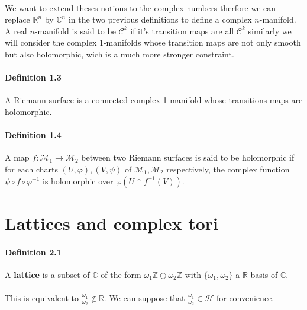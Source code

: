 \documentclass[letterpaper,10pt]{article}
\begin{document}
{\itshape \paragraph{} We want to extend theses notions to the complex numbers therfore we can replace $\mathbb{R}^n$ by $\mathbb{C}^n$ in the
 two previous definitions to define a complex $n$-manifold. A real $n$-manifold is said to be $\mathcal{C}^k$ if it's transition maps are all $\mathcal{C}^k$ 
 similarly we will consider the complex 1-manifolds whose transition maps are not only smooth but also holomorphic, wich is a much more stronger constraint.}

\paragraph{Definition 1.3} A Riemann surface is a connected complex 1-manifold whose transitions maps are holomorphic.

\paragraph{Definition 1.4} A map $f : \mathcal{M}_1 \to \mathcal{M}_2$ between two Riemann surfaces is said to be holomorphic if for each charts $(U,\varphi),(V,\psi)$
of $\mathcal{M}_1,\mathcal{M}_2$ respectively, the complex function $\psi \circ f \circ \varphi^{-1}$ is holomorphic over $\varphi(U\cap f^{-1}(V))$.





\section{Lattices and complex tori}%

\paragraph{Definition 2.1} A \textbf{lattice} is a subset of $\mathbb{C}$ of the form $\omega_1\mathbb{Z} \oplus \omega_2\mathbb{Z}$ with $\{\omega_1,\omega_2\}$ a 
$\mathbb{R}$-basis of $\mathbb{C}$. 
{\itshape \paragraph{} This is equivalent to  $\frac{\omega_1}{\omega_2} \notin \mathbb{R}$. We can suppose that $\frac{\omega_1}{\omega_2} \in \mathcal{H}$ for convenience.
}
\end{document}
